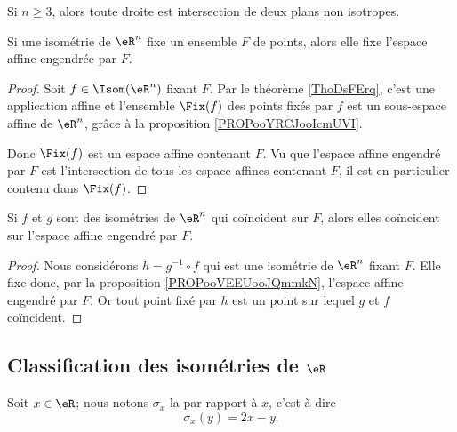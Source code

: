 \begin{lemma}
    Si \( n\geq 3\), alors toute droite est intersection de deux plans non isotropes.
\end{lemma}

\begin{proposition}      \label{PROPooVEEUooJQmmkN}
    Si une isométrie de \( \eR^n\) fixe un ensemble \( F\) de points, alors elle fixe l'espace affine engendrée par \( F\).
\end{proposition}

\begin{proof}
    Soit \( f\in \Isom(\eR^n)\) fixant \( F\). Par le théorème \ref{ThoDsFErq}, c'est une application affine et l'ensemble \( \Fix(f)\) des points fixés par \( f\) est un sous-espace affine de \( \eR^n\), grâce à la proposition \ref{PROPooYRCJooIcmUVI}.

    Donc \( \Fix(f)\) est un espace affine contenant \( F\). Vu que l'espace affine engendré par \( F\) est l'intersection de tous les espace affines contenant \( F\), il est en particulier contenu dans \( \Fix(f)\).
\end{proof}

\begin{corollary}       \label{CORooZHZZooDgTzsW}
    Si \( f\) et \( g\) sont des isométries de \( \eR^n\) qui coïncident sur \( F\), alors elles coïncident sur l'espace affine engendré par \( F\).
\end{corollary}

\begin{proof}
    Nous considérons \( h=g^{-1}\circ f\) qui est une isométrie de \( \eR^n\) fixant \( F\). Elle fixe donc, par la proposition \ref{PROPooVEEUooJQmmkN}, l'espace affine engendré par $F$. Or tout point fixé par \( h\) est un point sur lequel \( g\) et \( f\) coïncident.
\end{proof}

\subsection{Classification des isométries de \( \eR\)}

Soit \( x\in \eR\); nous notons \( \sigma_x\) la  par rapport à \( x\), c'est à dire
\begin{equation}
    \sigma_x(y)=2x-y.
\end{equation}

